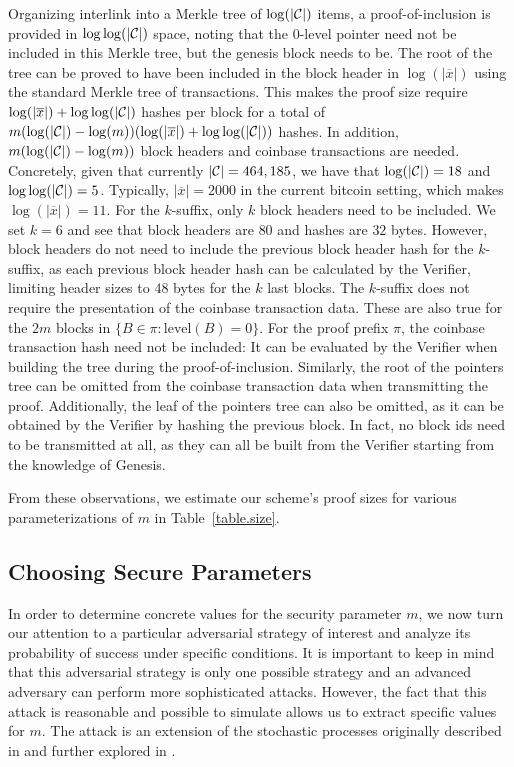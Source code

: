 Organizing interlink into a Merkle tree of $\log(|\mathcal{C}|)$ items, a
proof-of-inclusion is provided in $\log \log(|\mathcal{C}|)$ space, noting that the
$0$-level pointer need not be included in this Merkle tree, but the genesis
block needs to be. The root of the tree can be proved to have been included in
the block header in $\log(|\overline x|)$ using the standard Merkle tree of
transactions. This makes the proof size require $\log(|\overline x|) +
\log\log(|\mathcal{C}|)$ hashes per block for a total of $m (\log(|\mathcal{C}|) -
\log(m))(\log(|\overline x|) + \log\log(|\mathcal{C}|))$ hashes. In addition, $m
(\log(|\mathcal{C}|) - \log(m))$ block headers and coinbase transactions are needed.
Concretely, given that currently $|\mathcal{C}| = 464,185$, we have that
$\log(|\mathcal{C}|) = 18$ and $\log\log(|\mathcal{C}|) = 5$. Typically, $|\overline x| =
2000$ in the current bitcoin setting, which makes $\log(|\overline x|) = 11$.
For the $k$-suffix, only $k$ block headers need to be included. We set $k = 6$
and see that block headers are $80$ and hashes are $32$ bytes. However, block
headers do not need to include the previous block header hash for the
$k$-suffix, as each previous block header hash can be calculated by the
Verifier, limiting header sizes to $48$ bytes for the $k$ last blocks. The
$k$-suffix does not require the presentation of the coinbase transaction data.
These are also true for the $2m$ blocks in $\{B \in \pi: \text{level}(B) = 0\}$.
For the proof prefix $\pi$, the coinbase transaction hash need not be included:
It can be evaluated by the Verifier when building the tree during the
proof-of-inclusion. Similarly, the root of the pointers tree can be omitted from
the coinbase transaction data when transmitting the proof. Additionally, the
leaf of the pointers tree can also be omitted, as it can be obtained by the
Verifier by hashing the previous block. In fact, no block ids need to be
transmitted at all, as they can all be built from the Verifier starting from the
knowledge of Genesis.

From these observations, we estimate our scheme's proof sizes  for various
parameterizations of $m$ in Table~\ref{table.size}.

\subsection{Choosing Secure Parameters}
In order to determine concrete values for the security parameter $m$, we now
turn our attention to a particular adversarial strategy of interest and analyze
its probability of success under specific conditions. It is important to keep
in mind that this adversarial strategy is only one possible strategy and an
advanced adversary can perform more sophisticated attacks. However, the fact
that this attack is reasonable and possible to simulate allows us to extract
specific values for $m$.
The attack is an extension of the stochastic processes originally described in
\cite{bitcoin} and further explored in \cite{rosenfeld}.

